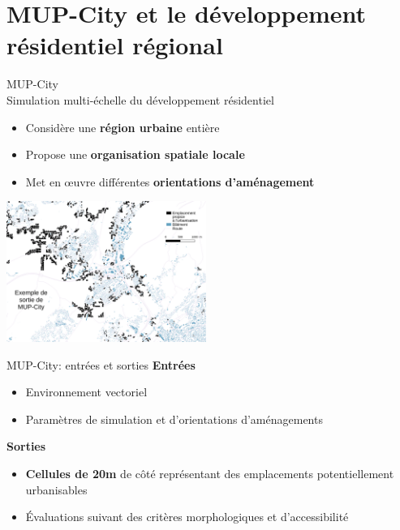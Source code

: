 \documentclass[xcolor=table]{beamer}
\begin{document}
\section[MUP-City]{MUP-City et le développement résidentiel régional}


\begin{frame}{MUP-City}
	\\
	Simulation multi-échelle du développement résidentiel 
	\begin{itemize}
		\item Considère une \textbf{région urbaine} entière
		\item Propose une \textbf{organisation spatiale locale}
		\item Met en œuvre différentes \textbf{orientations d'aménagement}
	\end{itemize}
	\includegraphics[width=6.5cm]{Images/ex-sorties-mup.png}
\end{frame}

\begin{frame}{MUP-City: entrées et sorties}
	\textbf{Entrées}
	\begin{itemize}
		\item Environnement vectoriel 
		\item Paramètres de simulation et d'orientations d'aménagements
	\end{itemize}
	\textbf{Sorties}
	\begin{itemize}
		\item \textbf{Cellules de 20m} de côté représentant des emplacements potentiellement urbanisables
		\item Évaluations suivant des critères morphologiques et d'accessibilité
	\end{itemize}
	\begin{block}{}\end{block}
\end{frame}
\end{document}
